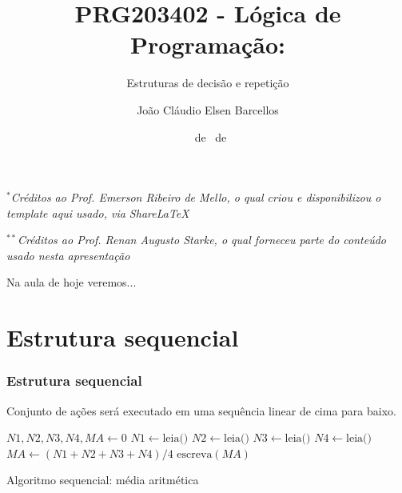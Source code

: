 \documentclass{beamer}
\title{PRG203402 - Lógica de Programação:}
\subtitle{\LARGE Estruturas de decisão e repetição}
\author{João Cláudio Elsen Barcellos}
\date{\scriptsize \DAY~de \MONTH~de \YEAR}
\institute{
  Engenheiro Eletricista\\
  Formado na Universidade Federal de Santa Catarina\\
  campus Florianópolis\\
  \url{joaoclaudiobarcellos@gmail.com}
}
\begin{document}
\captionsetup{labelformat=empty}

\begin{frame}[t]
    \maketitle
    \vspace{-1cm}
    \begin{flushleft}
        \vfill
        \textit{\tiny $^{*}$Créditos ao Prof. Emerson Ribeiro de Mello, o qual criou e disponibilizou o template aqui usado, via ShareLaTeX}\par
        \textit{\tiny $^{**}$Créditos ao Prof. Renan Augusto Starke, o qual forneceu parte do conteúdo usado nesta apresentação}
    \end{flushleft}
\end{frame}

\begin{frame}[t]{Na aula de hoje veremos...}
    \tableofcontents
\end{frame}

\section{Estrutura sequencial}

\begin{frame}[fragile]
\frametitle{Estrutura sequencial}

\SetAlFnt{\small}
\SetAlCapFnt{\large}
\SetAlCapNameFnt{\large}

\begin{block}{}
Conjunto de ações será executado em uma sequência linear de cima para baixo.
\end{block}

\begin{algorithm}[H]
\scriptsize
\DontPrintSemicolon
{}
\BlankLine
{}
$N1, N2, N3, N4, MA \gets 0$\;
\BlankLine
{}
$N1 \gets \text{leia()}$\;
$N2 \gets \text{leia()}$\;
$N3 \gets \text{leia()}$\;
$N4 \gets \text{leia()}$\;
\BlankLine
{}
$MA \gets (N1 + N2 + N3 + N4) / 4$\;
\BlankLine
{}
$\text{escreva}(MA)$\;
\caption{Algoritmo sequencial: média aritmética}
\label{alg:seq}
\end{algorithm}
\end{frame}
\end{document}
